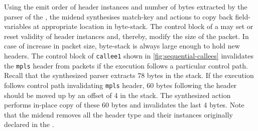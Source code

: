 \documentclass[letterpaper,twocolumn,10pt]{article}
\begin{document}
%
Using the emit order of header instances and number of bytes extracted
by the parser of the \uprogram, the midend synthesises match-key and
actions to copy back field-variables at appropriate location in
byte-stack.  The control block of a \uprogram may set or reset
validity of header instances and, thereby, modify the size of the
packet. In case of increase in packet size, byte-stack is always large
enough to hold new headers. The control block of \texttt{callee1}
shown in \cref{fig:sequential-callees} invalidates the \texttt{mpls}
header from packets if the execution follows a particular control
path. Recall that the synthesized parser extracts 78 bytes in the
stack. If the execution follows control path invalidating
\texttt{mpls} header, 60 bytes following the header should be moved up
by an offset of 4 in the stack. The synthesized action performs
in-place copy of these 60 bytes and invalidates the last 4 bytes.
Note that the midend removes all the header type and their instances
originally declared in the \uprogram.


\end{document}
